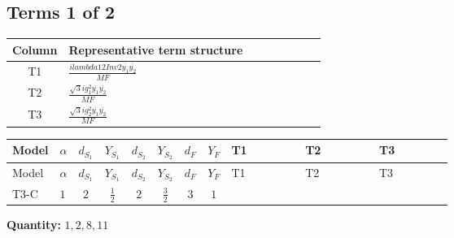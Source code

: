 \documentclass[8pt]{article}
\begin{document}
\begin{landscape}
\subsection*{Terms 1 of 2}
\begin{center}
\begin{tabular}{@{}c >{\raggedright\arraybackslash}p{0.82\linewidth}@{}}
\toprule
Column & Representative term structure \\
\midrule
T1 & \(\displaystyle \frac{i lambda12Inv2 \overline{y_{1}} \overline{y_{2}}}{MF}\) \\
\midrule
T2 & \(\displaystyle \frac{\sqrt{3} i g_{1}^{2} \overline{y_{1}} \overline{y_{2}}}{MF}\) \\
\midrule
T3 & \(\displaystyle \frac{\sqrt{3} i g_{2}^{2} \overline{y_{1}} \overline{y_{2}}}{MF}\) \\
\midrule
\bottomrule
\end{tabular}
\end{center}
\smallskip
\tiny
\begin{longtable}{@{}llcccccc >{\raggedright\arraybackslash}p{0.21\linewidth} >{\raggedright\arraybackslash}p{0.21\linewidth} >{\raggedright\arraybackslash}p{0.21\linewidth}@{}}
\toprule
Model & $\alpha$ & $d_{S_1}$ & $Y_{S_1}$ & $d_{S_2}$ & $Y_{S_2}$ & $d_F$ & $Y_F$ & T1 & T2 & T3 \\
\midrule
\endfirsthead
\toprule
Model & $\alpha$ & $d_{S_1}$ & $Y_{S_1}$ & $d_{S_2}$ & $Y_{S_2}$ & $d_F$ & $Y_F$ & T1 & T2 & T3 \\
\midrule
\endhead
T3-C & $1$ & $2$ & $\frac{1}{2}$ & $2$ & $\frac{3}{2}$ & $3$ & $1$ & \scriptsize\adjustbox{max width=\linewidth}{$\begin{gathered} - \frac{i lambda12Inv2 \overline{y_{1}} \overline{y_{2}}}{6 MF}\end{gathered}$} & \scriptsize\adjustbox{max width=\linewidth}{$\begin{gathered} - \frac{\sqrt{3} i g_{1}^{2} \overline{y_{1}} \overline{y_{2}}}{4 MF}\end{gathered}$} & \scriptsize\adjustbox{max width=\linewidth}{$\begin{gathered} - \frac{\sqrt{3} i g_{2}^{2} \overline{y_{1}} \overline{y_{2}}}{8 MF}\end{gathered}$} \\
\midrule
\bottomrule
\end{longtable}
\clearpage
\noindent\textbf{Quantity: }$\mathrm{1,2,8,11}$\par\smallskip

\end{landscape}
\end{document}
